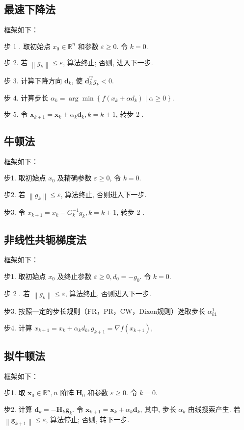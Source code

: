 \subsection{最速下降法}
框架如下：

			步 1 . 取初始点 $x_{0} \in \mathbb{R}^{n}$ 和参数 $\varepsilon \geqslant 0$. 令 $k=0$.

			步 2. 若 $\left\|g_{k}\right\| \leqslant \varepsilon$, 算法终止; 否则, 进入下一步.

			步 3. 计算下降方向 $\boldsymbol{d}_{k}$, 使 $\boldsymbol{d}_{k}^{\mathrm{T}} g_{k}<0$.

			步 4. 计算步长 $\alpha_{k}=\arg \min \left\{f\left(x_{k}+\alpha d_{k}\right) \mid \alpha \geqslant 0\right\}$.

			步 5. 令 $\boldsymbol{x}_{k+1}=\boldsymbol{x}_{k}+\alpha_{k} \boldsymbol{d}_{k}, k=k+1$, 转步 2 .
\subsection{牛顿法}
框架如下：

步1. 取初始点 $x_{0}$ 及精确参数 $\varepsilon \geq 0$, 令 $k=0$.

步2. 若 $\left\|g_{k}\right\| \leq \varepsilon$, 算法终止, 否则进入下一步.

步3. 令 $x_{k+1}=x_{k}-G_{k}^{-1} g_{k}, k=k+1$, 转步 2 .
\subsection{非线性共轭梯度法}
框架如下：

步1. 取初始点 $x_{0}$ 及终止参数 $\varepsilon \geq 0, d_{0}=-g_{0}$. 令 $k=0$.

步 2 . 若 $\left\|g_{k}\right\| \leq \varepsilon$, 算法终止, 否则进入下一步.

步3. 按照一定的步长规则（FR，PR，CW，Dixon规则）选取步长 $\alpha_{k 1}^{1}$ 

步4. 计算 $x_{k+1}=x_{k}+\alpha_{k} d_{k}, g_{k+1}=\nabla f\left(x_{k+1}\right)$,

\subsection{拟牛顿法}
框架如下：

步1. 取 $\boldsymbol{x}_{0} \in \mathbb{R}^{n}, n$ 阶阵 $\boldsymbol{H}_{0}$ 和参数 $\varepsilon \geqslant 0$. 令 $k=0$.

步2. 计算 $\boldsymbol{d}_{k}=-\boldsymbol{H}_{k} \boldsymbol{g}_{k}$. 令 $\boldsymbol{x}_{k+1}=\boldsymbol{x}_{k}+\alpha_{k} \boldsymbol{d}_{k}$, 其中, 步长 $\alpha_{k}$ 由线搜索产生. 若 $\left\|\boldsymbol{g}_{k+1}\right\| \leqslant \varepsilon$, 算法停止; 否则, 转下一步.

